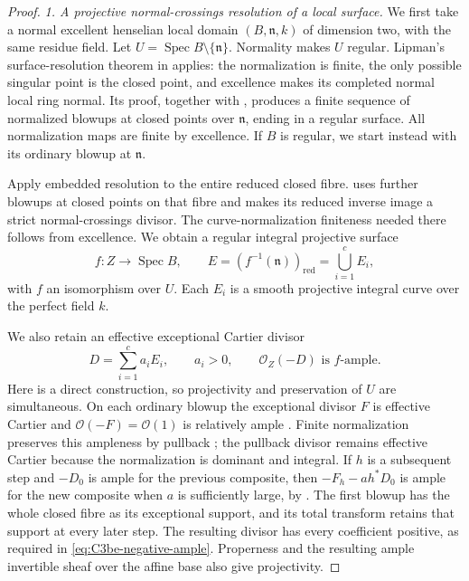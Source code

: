 \begin{proof}
\emph{1. A projective normal-crossings resolution of a local surface.}
We first take a normal excellent henselian local domain
\((B,\mathfrak n,k)\) of dimension two, with the same residue
field. Let \(U=\operatorname{Spec}B\setminus\{\mathfrak n\}\).
Normality makes \(U\) regular. Lipman's surface-resolution theorem
in \citet[Theorem 54.14.5, Tag 0BGP]{frC3beStacksLipman}
applies: the normalization is finite, the only possible singular
point is the closed point, and excellence makes its completed
normal local ring normal. Its proof, together with
\citet[Lemma 54.6.5, Tag 0BFZ]{frC3beStacksNormalizedPointBlowups},
produces a finite sequence of normalized blowups at closed points
over \(\mathfrak n\), ending in a regular surface. All normalization
maps are finite by excellence. If \(B\) is regular, we start
instead with its ordinary blowup at \(\mathfrak n\).

Apply embedded resolution to the entire reduced closed fibre.
\citet[Lemma 54.15.6, Tag 0BIC]{frC3beStacksSurfaceSNC}
uses further blowups at closed points on that fibre and makes its
reduced inverse image a strict normal-crossings divisor. The
curve-normalization finiteness needed there follows from
excellence. We obtain a regular integral projective surface
\[
 f:Z\longrightarrow\operatorname{Spec}B,\qquad
 E=(f^{-1}(\mathfrak n))_{\mathrm{red}}=\bigcup_{i=1}^{c}E_i,
\]
with \(f\) an isomorphism over \(U\). Each \(E_i\) is a smooth
projective integral curve over the perfect field \(k\).

We also retain an effective exceptional Cartier divisor
\begin{equation}\label{eq:C3be-negative-ample}
 D=\sum_{i=1}^{c}a_iE_i,\qquad a_i>0,\qquad
                    \mathcal O_Z(-D)\text{ is }f\text{-ample}.
\end{equation}
Here is a direct construction, so projectivity and preservation
of \(U\) are simultaneous. On each ordinary blowup the exceptional
divisor \(F\) is effective Cartier and
\(\mathcal O(-F)=\mathcal O(1)\) is relatively ample
\citep[Section 31.33 and Lemma 31.33.4, Tag 02OS]
{frC3beStacksBlowupTautological}. Finite normalization preserves
this ampleness by pullback
\citep[Lemma 30.17.2, Tag 0B5V]{frC3beStacksFiniteAmple};
the pullback divisor remains effective Cartier because the
normalization is dominant and integral. If \(h\) is a subsequent
step and \(-D_0\) is ample for the previous composite, then
\(-F_h-a h^*D_0\) is ample for the new composite when \(a\)
is sufficiently large, by
\citet[Lemma 29.38.8, Tag 0C4K]{frC3beStacksCompositeAmple}.
The first blowup has the whole closed fibre as its exceptional
support, and its total transform retains that support at every
later step. The resulting divisor has every coefficient positive,
as required in \eqref{eq:C3be-negative-ample}. Properness and
the resulting ample invertible sheaf over the affine base also
give projectivity.


\end{proof}
